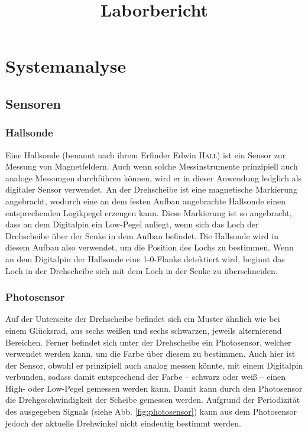 \documentclass{kis}
\title{Laborbericht}
\begin{document}
\maketitle
{}
\setcounter{tocdepth}{2}
\tableofcontents
\listoffigures
\clearpage
{}

\section{Systemanalyse}

\subsection{Sensoren}
\subsubsection{Hallsonde} 
Eine Hallsonde (benannt nach ihrem Erfinder Edwin \textsc{Hall}) ist ein Sensor zur Messung von Magnetfeldern. Auch wenn solche Messinstrumente prinzipiell auch analoge Messungen durchführen können, wird er in dieser Anwendung ledglich als digitaler Sensor verwendet. An der Drehscheibe ist eine magnetische Markierung angebracht, wodurch eine an dem festen Aufbau angebrachte Hallsonde einen entsprechenden Logikpegel erzeugen kann. Diese Markierung ist so angebracht, dass an dem Digitalpin ein Low-Pegel anliegt, wenn sich das Loch der Drehscheibe über der Senke in dem Aufbau befindet. Die Hallsonde wird in diesem Aufbau also verwendet, um die Position des Lochs zu bestimmen. Wenn an dem Digitalpin der Hallsonde eine 1-0-Flanke detektiert wird, beginnt das Loch in der Drehscheibe sich mit dem Loch in der Senke zu überschneiden.

\subsubsection{Photosensor}
Auf der Unterseite der Drehscheibe befindet sich ein Muster ähnlich wie bei einem Glücksrad, aus sechs weißen und sechs schwarzen, jeweils alternierend Bereichen. Ferner befindet sich unter der Drehscheibe ein Photosensor, welcher verwendet werden kann, um die Farbe über diesem zu bestimmen. Auch hier ist der Sensor, obwohl er prinzipiell auch analog messen könnte, mit einem Digitalpin verbunden, sodass damit entsprechend der Farbe -- schwarz oder weiß -- einen High- oder Low-Pegel gemessen werden kann. Damit kann durch den Photosensor die Drehgeschwindigkeit der Scheibe gemessen werden. Aufgrund der Periodizität des ausgegeben Signals (siehe Abb. \ref{fig:photosensor}) kann aus dem Photosensor jedoch der aktuelle Drehwinkel nicht eindeutig bestimmt werden.
\end{document}

